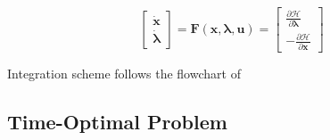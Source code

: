 \begin{equation}
\begin{bmatrix}
\mathbf{\dot{x}} \\ \boldsymbol{\dot{\lambda}} 
\end{bmatrix}
=
\mathbf{F}(\mathbf{x}, \boldsymbol{\lambda}, \mathbf{u})
=
\begin{bmatrix}
\frac{\partial \mathcal{H}}{\partial \boldsymbol{\lambda}} \\
-\frac{\partial \mathcal{H}}{\partial \mathbf{x}}
\end{bmatrix}
\end{equation}

Integration scheme follows the flowchart of \cite[Figure 1]{paper_topputo}

\subsection{Time-Optimal Problem}

